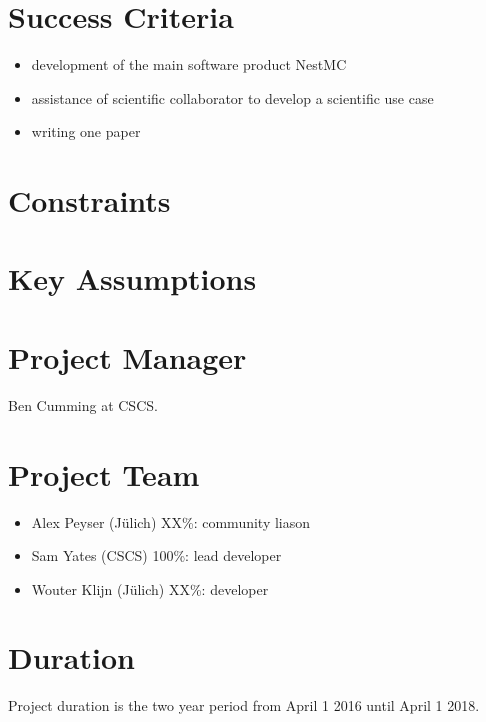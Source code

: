 \documentclass[11pt,a4paper]{article}
\begin{document}
\section{Success Criteria}

\begin{itemize}
    \item development of the main software product NestMC
    \item assistance of scientific collaborator to develop a scientific use case
    \item writing one paper
\end{itemize}

\section{Constraints}

\section{Key Assumptions}

\section{Project Manager}
Ben Cumming at CSCS.

\section{Project Team}
\begin{itemize}
    \item Alex Peyser (J\"ulich) XX\%: community liason
    \item Sam Yates (CSCS) 100\%: lead developer
    \item Wouter Klijn (J\"ulich) XX\%: developer
\end{itemize}

\section{Duration}
Project duration is the two year period from April 1 2016 until April 1 2018.
\end{document}
